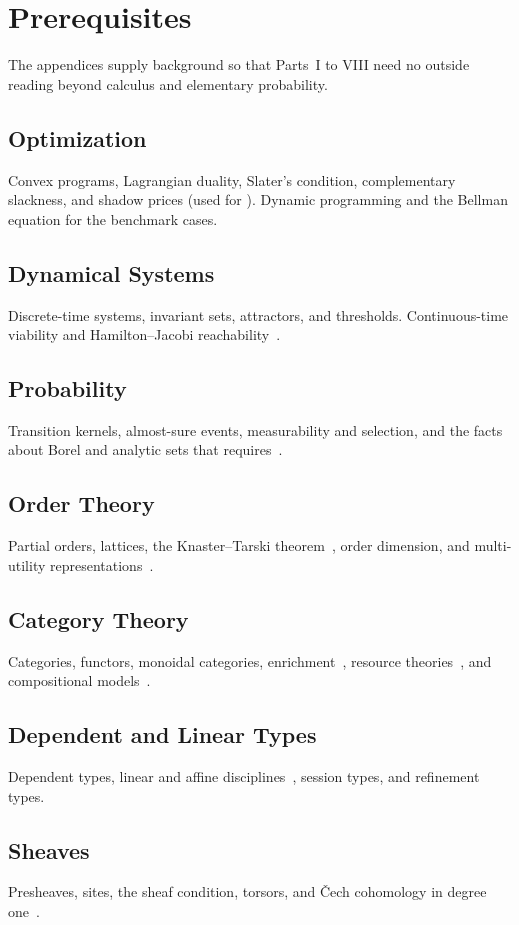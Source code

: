 \chapter{Prerequisites}

The appendices supply background so that Parts~I to VIII need no outside reading beyond calculus and elementary probability.

\section{Optimization}
Convex programs, Lagrangian duality, Slater's condition, complementary slackness, and shadow prices (used for ). Dynamic programming and the Bellman equation for the benchmark cases.

\section{Dynamical Systems}
Discrete-time systems, invariant sets, attractors, and thresholds. Continuous-time viability and Hamilton--Jacobi reachability~\cite{aubin1991,mitchell2005}.

\section{Probability}
Transition kernels, almost-sure events, measurability and selection, and the facts about Borel and analytic sets that  requires~\cite{bertsekas1978}.

\section{Order Theory}
Partial orders, lattices, the Knaster--Tarski theorem~\cite{tarski1955}, order dimension, and multi-utility representations~\cite{dushnik1941}.

\section{Category Theory}
Categories, functors, monoidal categories, enrichment~\cite{lawvere1973}, resource theories~\cite{coecke2016}, and compositional models~\cite{fong2019,maclane1998}.

\section{Dependent and Linear Types}
Dependent types, linear and affine disciplines~\cite{girard1987}, session types, and refinement types.

\section{Sheaves}
Presheaves, sites, the sheaf condition, torsors, and \v{C}ech cohomology in degree one~\cite{maclane1992}.

